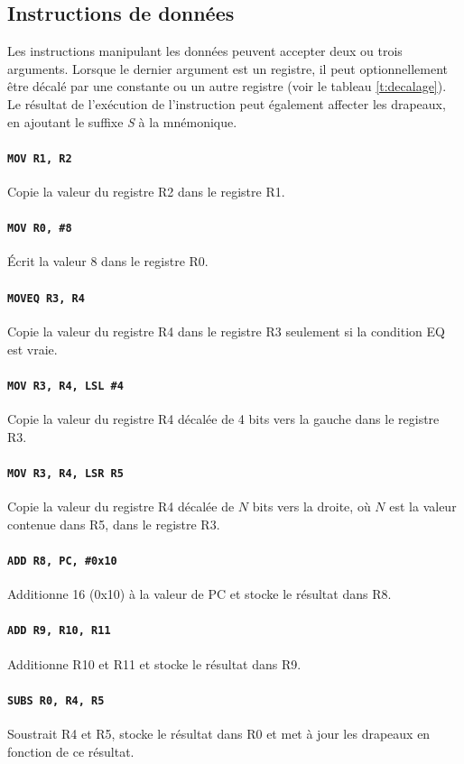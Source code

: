 \documentclass{tufte-handout}
\begin{document}
\subsection{Instructions de données}

Les instructions manipulant les données peuvent accepter deux ou trois arguments. Lorsque le dernier argument est un registre, il peut optionnellement être décalé par une constante ou un autre registre (voir le tableau \ref{t:decalage}). Le résultat de l'exécution de l'instruction peut également affecter les drapeaux, en ajoutant le suffixe \textit{S} à la mnémonique.

\paragraph{\texttt{MOV R1, R2}} Copie la valeur du registre R2 dans le registre R1.
\paragraph{\texttt{MOV R0, \#8}} Écrit la valeur 8 dans le registre R0.
\paragraph{\texttt{MOVEQ R3, R4}} Copie la valeur du registre R4 dans le registre R3 seulement si la condition EQ est vraie.
\paragraph{\texttt{MOV R3, R4, LSL \#4}} Copie la valeur du registre R4 décalée de 4 bits vers la gauche dans le registre R3.
\paragraph{\texttt{MOV R3, R4, LSR R5}} Copie la valeur du registre R4 décalée de $N$ bits vers la droite, où $N$ est la valeur contenue dans R5, dans le registre R3.

\paragraph{\texttt{ADD R8, PC, \#0x10}} Additionne 16 (0x10) à la valeur de PC et stocke le résultat dans R8.
\paragraph{\texttt{ADD R9, R10, R11}} Additionne R10 et R11 et stocke le résultat dans R9.
\paragraph{\texttt{SUBS R0, R4, R5}} Soustrait R4 et R5, stocke le résultat dans R0 et met à jour les drapeaux en fonction de ce résultat.
\end{document}
